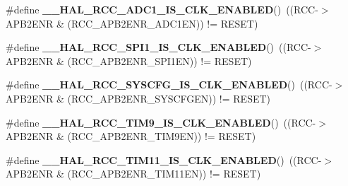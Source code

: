\begin{DoxyCompactItemize}
\#define {\bfseries \+\_\+\+\_\+\+H\+A\+L\+\_\+\+R\+C\+C\+\_\+\+A\+D\+C1\+\_\+\+I\+S\+\_\+\+C\+L\+K\+\_\+\+E\+N\+A\+B\+L\+ED}()~((R\+CC-\/$>$A\+P\+B2\+E\+NR \& (R\+C\+C\+\_\+\+A\+P\+B2\+E\+N\+R\+\_\+\+A\+D\+C1\+EN)) != R\+E\+S\+ET)
\item 
\mbox{\label{group___r_c_c___a_p_b2___peripheral___clock___enable___disable___status_gab1787d7cdf591c099b8d96848aee835e}} 
\#define {\bfseries \+\_\+\+\_\+\+H\+A\+L\+\_\+\+R\+C\+C\+\_\+\+S\+P\+I1\+\_\+\+I\+S\+\_\+\+C\+L\+K\+\_\+\+E\+N\+A\+B\+L\+ED}()~((R\+CC-\/$>$A\+P\+B2\+E\+NR \& (R\+C\+C\+\_\+\+A\+P\+B2\+E\+N\+R\+\_\+\+S\+P\+I1\+EN)) != R\+E\+S\+ET)
\item 
\mbox{\label{group___r_c_c___a_p_b2___peripheral___clock___enable___disable___status_gad1ea95d1d5f3a2ecf2b903c4ed22e7c6}} 
\#define {\bfseries \+\_\+\+\_\+\+H\+A\+L\+\_\+\+R\+C\+C\+\_\+\+S\+Y\+S\+C\+F\+G\+\_\+\+I\+S\+\_\+\+C\+L\+K\+\_\+\+E\+N\+A\+B\+L\+ED}()~((R\+CC-\/$>$A\+P\+B2\+E\+NR \& (R\+C\+C\+\_\+\+A\+P\+B2\+E\+N\+R\+\_\+\+S\+Y\+S\+C\+F\+G\+EN)) != R\+E\+S\+ET)
\item 
\mbox{\label{group___r_c_c___a_p_b2___peripheral___clock___enable___disable___status_gafab635405d33757b42a3df0d89416e8a}} 
\#define {\bfseries \+\_\+\+\_\+\+H\+A\+L\+\_\+\+R\+C\+C\+\_\+\+T\+I\+M9\+\_\+\+I\+S\+\_\+\+C\+L\+K\+\_\+\+E\+N\+A\+B\+L\+ED}()~((R\+CC-\/$>$A\+P\+B2\+E\+NR \& (R\+C\+C\+\_\+\+A\+P\+B2\+E\+N\+R\+\_\+\+T\+I\+M9\+EN)) != R\+E\+S\+ET)
\item 
\mbox{\label{group___r_c_c___a_p_b2___peripheral___clock___enable___disable___status_ga7db5f2ab1e44c7ebd59a56d3bdd2a517}} 
\#define {\bfseries \+\_\+\+\_\+\+H\+A\+L\+\_\+\+R\+C\+C\+\_\+\+T\+I\+M11\+\_\+\+I\+S\+\_\+\+C\+L\+K\+\_\+\+E\+N\+A\+B\+L\+ED}()~((R\+CC-\/$>$A\+P\+B2\+E\+NR \& (R\+C\+C\+\_\+\+A\+P\+B2\+E\+N\+R\+\_\+\+T\+I\+M11\+EN)) != R\+E\+S\+ET)
\item 
\mbox{\label{group___r_c_c___a_p_b2___peripheral___clock___enable___disable___status_ga7116893adbb7fc144102af49de55350b}} 

\end{DoxyCompactItemize}
